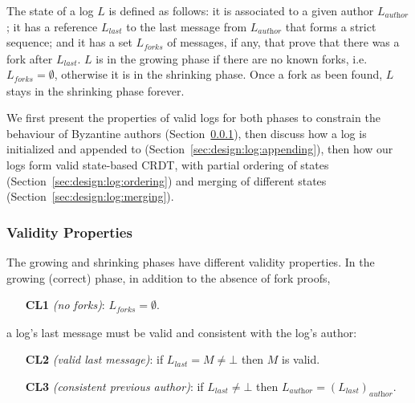 \documentclass[9pt, oneside]{article}   	%
\begin{document}
The state of a log $L$ is defined as follows: it is associated to a given author $L_\textit{author}$; it has a reference $L_\textit{last}$ to the last message from $L_\textit{author}$ that forms a strict sequence; and it has a set $L_\textit{forks}$ of messages, if any, that prove that there was a fork after $L_\textit{last}$. $L$ is in the growing phase if there are no known forks, i.e. $L_\textit{forks} = \emptyset$, otherwise it is in the shrinking phase. Once a fork as been found, $L$ stays in the shrinking phase forever. 

We first present the properties of valid logs for both phases to constrain the behaviour of Byzantine authors (Section~\ref{sec:design:log:validity}), then discuss how a log is initialized and appended to (Section~\ref{sec:design:log:appending}), then how our logs form valid state-based CRDT, with partial ordering of states (Section~\ref{sec:design:log:ordering}) and merging of different states (Section~\ref{sec:design:log:merging}). 

\subsubsection{Validity Properties}
\label{sec:design:log:validity}

The growing and shrinking phases have different validity properties. In the growing (correct) phase, in addition to the absence of fork proofs,
\begin{tcolorbox}
\begin{enumerate}
	\item[\textbf{CL1}] \textit{(no forks)}: $L_\textit{forks} = \emptyset$.
\end{enumerate}
\end{tcolorbox}

a log's last message must be valid and consistent with the log's author:
\begin{tcolorbox}
\begin{enumerate}
	\item[\textbf{CL2}] \textit{(valid last message)}: if $L_\textit{last} = M \neq \bot$ then $M$ is valid.
	\item[\textbf{CL3}] \textit{(consistent previous author)}: if $L_\textit{last} \neq \bot$ then $L_\textit{author} = (L_\textit{last})_\textit{author}$.
\end{enumerate}
\end{tcolorbox}
\end{document}
